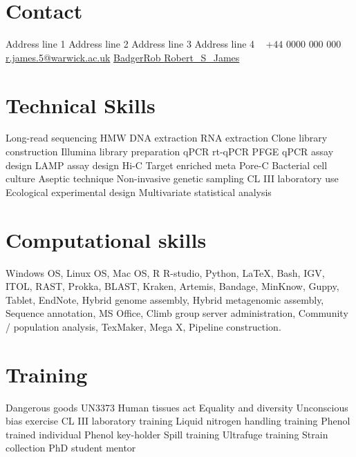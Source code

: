 \documentclass[hidelinks]{james-cv} %
\begin{document}


\begin{aside} 
\section{Contact}
Address line 1
Address line 2
Address line 3
Address line 4
~
\color{black}\bodyfontcontact +$44$ $0000$ $000$ $000$ \Mobilefone
\color{blue}\href{mailto:r.james.5@warwick.ac.uk}{r.james.5@warwick.ac.uk} \color{black}\Envelope
\color{blue}\href{https://github.com/BadgerRob}{BadgerRob } \color{black}\faGithub
\color{blue}\href{http://twitter.com/Robert_S_James}{Robert\_S\_James} \color{black}\faTwitter
\headingfont\section{Technical Skills}
\thinfont\footnotesize{} Long-read sequencing \textbullet{}
HMW DNA extraction \textbullet{}
RNA extraction \textbullet{}
Clone library construction \textbullet{}
Illumina library preparation \textbullet{}
qPCR \textbullet{}
rt-qPCR \textbullet{}
PFGE \textbullet{}
qPCR assay design \textbullet{}
LAMP assay design \textbullet{}
Hi-C \textbullet{}
Target enriched meta Pore-C \textbullet{}
Bacterial cell culture \textbullet{}
Aseptic technique \textbullet{}
Non-invasive genetic sampling \textbullet{}
CL III laboratory use \textbullet{}
Ecological experimental design \textbullet{}
Multivariate statistical analysis \textbullet{}
\headingfont\section{Computational skills}
\emergencystretch=5pt\justify\thinfont\footnotesize\nolinebreak{}Windows OS, Linux OS, Mac OS, R R-studio, Python, \LaTeX, Bash, IGV, ITOL, RAST, Prokka, BLAST, Kraken, Artemis, Bandage, MinKnow, Guppy, Tablet, EndNote, Hybrid genome assembly, Hybrid metagenomic assembly, Sequence annotation, MS Office, Climb group server administration, Community / population analysis, TexMaker, Mega X, Pipeline construction.\headingfont\flushright\section{Training}

\flushright\thinfont\footnotesize{} 
Dangerous goods UN3373 \textbullet{}
Human tissues act \textbullet{}
Equality and diversity \textbullet{}
Unconscious bias exercise \textbullet{}
CL III laboratory training \textbullet{}
Liquid nitrogen handling training \textbullet{}
Phenol trained individual \textbullet{}
Phenol key-holder \textbullet{}
Spill training \textbullet{}
Ultrafuge training \textbullet{}
Strain collection \textbullet{}
PhD student mentor \textbullet{}
\end{aside}
\end{document}
